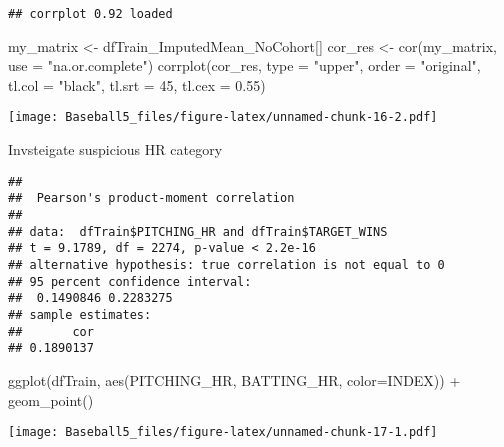 \documentclass[
]{article}
\newenvironment{Shaded}{\begin{snugshade}}{\end{snugshade}}
\newcommand{\AttributeTok}[1]{\textcolor[rgb]{0.77,0.63,0.00}{#1}}
\newcommand{\DecValTok}[1]{\textcolor[rgb]{0.00,0.00,0.81}{#1}}
\newcommand{\FloatTok}[1]{\textcolor[rgb]{0.00,0.00,0.81}{#1}}
\newcommand{\FunctionTok}[1]{\textcolor[rgb]{0.00,0.00,0.00}{#1}}
\newcommand{\NormalTok}[1]{#1}
\newcommand{\OtherTok}[1]{\textcolor[rgb]{0.56,0.35,0.01}{#1}}
\newcommand{\SpecialCharTok}[1]{\textcolor[rgb]{0.00,0.00,0.00}{#1}}
\newcommand{\StringTok}[1]{\textcolor[rgb]{0.31,0.60,0.02}{#1}}
\begin{document}
\begin{verbatim}
## corrplot 0.92 loaded
\end{verbatim}

\begin{Shaded}
\begin{Highlighting}[]
\NormalTok{my\_matrix }\OtherTok{\textless{}{-}}\NormalTok{ dfTrain\_ImputedMean\_NoCohort[]}
\NormalTok{cor\_res }\OtherTok{\textless{}{-}} \FunctionTok{cor}\NormalTok{(my\_matrix, }\AttributeTok{use =} \StringTok{"na.or.complete"}\NormalTok{)}
\FunctionTok{corrplot}\NormalTok{(cor\_res,}
\AttributeTok{type =} \StringTok{"upper"}\NormalTok{,}
\AttributeTok{order =} \StringTok{"original"}\NormalTok{,}
\AttributeTok{tl.col =} \StringTok{"black"}\NormalTok{,}
\AttributeTok{tl.srt =} \DecValTok{45}\NormalTok{,}
\AttributeTok{tl.cex =} \FloatTok{0.55}\NormalTok{)}
\end{Highlighting}
\end{Shaded}

\texttt{[image: Baseball5\_files/figure-latex/unnamed-chunk-16-2.pdf]}

Invsteigate suspicious HR category

\begin{Shaded}
\end{Shaded}

\begin{verbatim}
## 
##  Pearson's product-moment correlation
## 
## data:  dfTrain$PITCHING_HR and dfTrain$TARGET_WINS
## t = 9.1789, df = 2274, p-value < 2.2e-16
## alternative hypothesis: true correlation is not equal to 0
## 95 percent confidence interval:
##  0.1490846 0.2283275
## sample estimates:
##       cor 
## 0.1890137
\end{verbatim}

\begin{Shaded}
\begin{Highlighting}[]
\FunctionTok{ggplot}\NormalTok{(dfTrain, }\FunctionTok{aes}\NormalTok{(PITCHING\_HR, BATTING\_HR, }\AttributeTok{color=}\NormalTok{INDEX)) }\SpecialCharTok{+}
  \FunctionTok{geom\_point}\NormalTok{()}
\end{Highlighting}
\end{Shaded}

\texttt{[image: Baseball5\_files/figure-latex/unnamed-chunk-17-1.pdf]}
\end{document}
